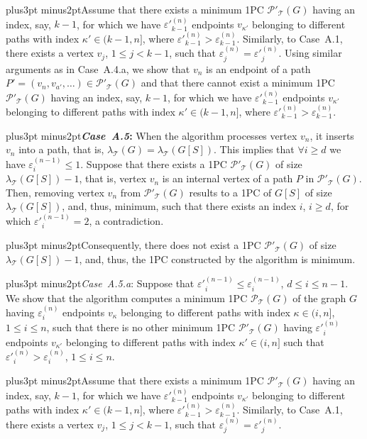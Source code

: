 \documentclass[10pt]{article}
\def\yskip{\penalty-50\vskip3pt plus3pt minus2pt}
\def\y{\yskip}
\begin{document}
{\y Assume that there exists a minimum 1PC
$\mathcal{P'_{\mathcal{T}}}(G)$ having an index, say, $k-1$, for
which we have $\varepsilon'^{(n)}_{k-1}$ endpoints $v_{\kappa'}$
belonging to different paths with index $\kappa' \in (k-1,n]$,
where $\varepsilon'^{(n)}_{k-1}>\varepsilon^{(n)}_{k-1}$.
Similarly, to Case~A.1, there exists a vertex $v_j$, $1 \leq j <
k-1$, such that $\varepsilon^{(n)}_j = \varepsilon'^{(n)}_j$.
Using similar arguments as in Case~A.4.a, we show that $v_n$ is an
endpoint of a path $P'=(v_n, v_{a'}, \ldots) \in
\mathcal{P'_{\mathcal{T}}}(G)$ and that there cannot exist a
minimum 1PC $\mathcal{P'_{\mathcal{T}}}(G)$ having an index, say,
$k-1$, for which we have $\varepsilon'^{(n)}_{k-1}$ endpoints
$v_{\kappa'}$ belonging to different paths with index $\kappa' \in
(k-1,n]$, where
$\varepsilon'^{(n)}_{k-1}>\varepsilon^{(n)}_{k-1}$.



\y {\bf \textit{Case~A.5}:} When the algorithm processes vertex
$v_n$, it inserts $v_n$ into a path, that is,
$\lambda_\mathcal{T}(G)=\lambda_\mathcal{T}(G[S])$. This implies
that $\forall i \geq d$ we have $\varepsilon^{(n-1)}_i \leq 1$.
Suppose that there exists a 1PC $\mathcal{P'_{\mathcal{T}}}(G)$ of
size $\lambda_\mathcal{T}(G[S])-1$, that is, vertex $v_n$ is an
internal vertex of a path $P$ in $\mathcal{P'_{\mathcal{T}}}(G)$.
Then, removing vertex $v_n$ from $\mathcal{P'_{\mathcal{T}}}(G)$
results to a 1PC of $G[S]$ of size $\lambda_\mathcal{T}(G[S])$,
and, thus, minimum, such that there exists an index $i$, $i \geq
d$, for which $\varepsilon'^{(n-1)}_i=2$, a contradiction.

\y Consequently, there does not exist a 1PC
$\mathcal{P'_{\mathcal{T}}}(G)$ of size
$\lambda_\mathcal{T}(G[S])-1$, and, thus, the 1PC constructed by
the algorithm is minimum.

\y \textit{Case~A.5.a}: Suppose that $\varepsilon'^{(n-1)}_i \leq
\varepsilon^{(n-1)}_i$, $d \leq i \leq n-1$. We show that the
algorithm computes a minimum 1PC $\mathcal{P_{\mathcal{T}}}(G)$ of
the graph $G$ having $\varepsilon^{(n)}_i$ endpoints $v_\kappa$
belonging to different paths with index $\kappa \in (i,n]$, $1
\leq i \leq n$, such that there is no other minimum 1PC
$\mathcal{P'_{\mathcal{T}}}(G)$ having $\varepsilon'^{(n)}_i$
endpoints $v_{\kappa'}$ belonging to different paths with index
$\kappa' \in (i,n]$ such that
$\varepsilon'^{(n)}_i>\varepsilon^{(n)}_i$, $1 \leq i \leq n$.

\y Assume that there exists a minimum 1PC
$\mathcal{P'_{\mathcal{T}}}(G)$ having an index, say, $k-1$, for
which we have $\varepsilon'^{(n)}_{k-1}$ endpoints $v_{\kappa'}$
belonging to different paths with index $\kappa' \in (k-1,n]$,
where $\varepsilon'^{(n)}_{k-1}>\varepsilon^{(n)}_{k-1}$.
Similarly, to Case~A.1, there exists a vertex $v_j$, $1 \leq j <
k-1$, such that $\varepsilon^{(n)}_j = \varepsilon'^{(n)}_j$.

}
\end{document}
